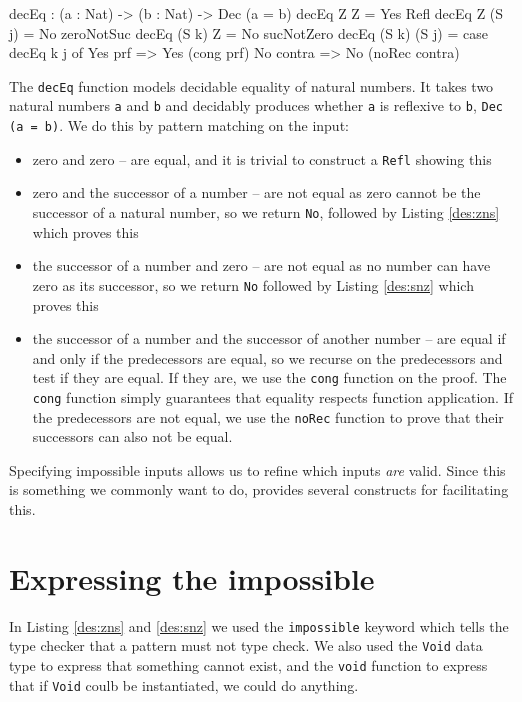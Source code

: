    	\begin{code}[label={des:dec-eq}, caption={Proving equality of natural numbers}]
    decEq : (a : Nat) -> (b : Nat) -> Dec (a = b)
    decEq Z Z = Yes Refl
    decEq Z (S j) = No zeroNotSuc
    decEq (S k) Z = No sucNotZero
    decEq (S k) (S j) = case decEq k j of
                            Yes prf => Yes (cong prf)
                            No contra => No (noRec contra)
   	\end{code}
    The \texttt{decEq} function models decidable equality of natural numbers. It takes two natural numbers \texttt{a} and \texttt{b} and decidably produces whether \texttt{a} is reflexive to \texttt{b}, \texttt{Dec (a = b)}. We do this by pattern matching on the input:
    \begin{itemize}
        \item zero and zero -- are equal, and it is trivial to construct a
              \texttt{Refl} showing this
        \item zero and the successor of a number -- are not equal as zero cannot
              be the successor of a natural number, so we return \texttt{No},
              followed by Listing \ref{des:zns} which proves this
        \item the successor of a number and zero -- are not equal as no number 
              can have zero as its successor, so we return \texttt{No} followed
              by Listing \ref{des:snz} which proves this
        \item the successor of a number and the successor of another number --
              are equal if and only if the predecessors are equal, so we recurse
              on the predecessors and test if they are equal. If they are, we
              use the \texttt{cong} function on the proof. The \texttt{cong}
              function simply guarantees that equality respects function
              application. If the predecessors are not equal, we use the
              \texttt{noRec} function to prove that their successors can also
              not be equal.
    \end{itemize}

    Specifying impossible inputs allows us to refine which inputs \textit{are} valid. Since this is something we commonly want to do, \Idris provides several constructs for facilitating this.


\section{Expressing the impossible}
    In Listing \ref{des:zns} and \ref{des:snz} we used the \texttt{impossible} keyword which tells the type checker that a pattern must not type check. We also used the \texttt{Void} data type to express that something cannot exist, and the \texttt{void} function to express that if \texttt{Void} coulb be instantiated, we could do anything.
    
